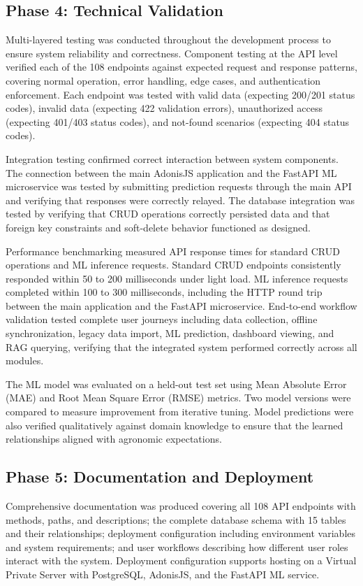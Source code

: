 \documentclass[12pt,a4paper,oneside]{report}
\begin{document}
\subsection{Phase 4: Technical Validation}
Multi-layered testing was conducted throughout the development process to ensure system reliability and correctness. Component testing at the API level verified each of the 108 endpoints against expected request and response patterns, covering normal operation, error handling, edge cases, and authentication enforcement. Each endpoint was tested with valid data (expecting 200/201 status codes), invalid data (expecting 422 validation errors), unauthorized access (expecting 401/403 status codes), and not-found scenarios (expecting 404 status codes).

Integration testing confirmed correct interaction between system components. The connection between the main AdonisJS application and the FastAPI ML microservice was tested by submitting prediction requests through the main API and verifying that responses were correctly relayed. The database integration was tested by verifying that CRUD operations correctly persisted data and that foreign key constraints and soft-delete behavior functioned as designed.

Performance benchmarking measured API response times for standard CRUD operations and ML inference requests. Standard CRUD endpoints consistently responded within 50 to 200 milliseconds under light load. ML inference requests completed within 100 to 300 milliseconds, including the HTTP round trip between the main application and the FastAPI microservice. End-to-end workflow validation tested complete user journeys including data collection, offline synchronization, legacy data import, ML prediction, dashboard viewing, and RAG querying, verifying that the integrated system performed correctly across all modules.

The ML model was evaluated on a held-out test set using Mean Absolute Error (MAE) and Root Mean Square Error (RMSE) metrics. Two model versions were compared to measure improvement from iterative tuning. Model predictions were also verified qualitatively against domain knowledge to ensure that the learned relationships aligned with agronomic expectations.

\subsection{Phase 5: Documentation and Deployment}
Comprehensive documentation was produced covering all 108 API endpoints with methods, paths, and descriptions; the complete database schema with 15 tables and their relationships; deployment configuration including environment variables and system requirements; and user workflows describing how different user roles interact with the system. Deployment configuration supports hosting on a Virtual Private Server with PostgreSQL, AdonisJS, and the FastAPI ML service.
\end{document}
